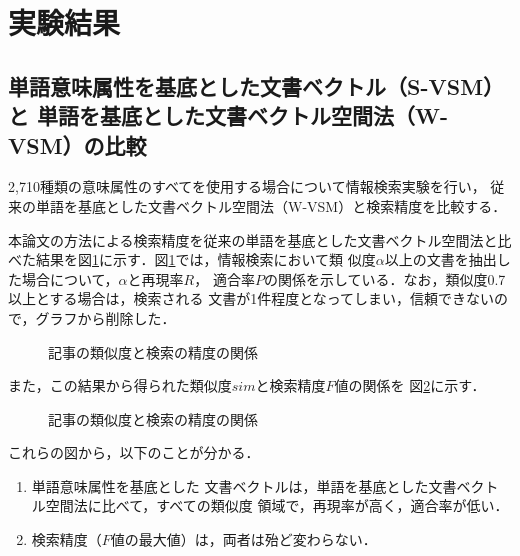 \section {実験結果}

\subsection{単語意味属性を基底とした文書ベクトル（S-VSM）と
単語を基底とした文書ベクトル空間法（W-VSM）の比較}

2,710種類の意味属性のすべてを使用する場合について情報検索実験を行い，
従来の単語を基底とした文書ベクトル空間法（W-VSM）と検索精度を比較する．

本論文の方法による検索精度を従来の単語を基底とした文書ベクトル空間法と比
べた結果を図\ref{result1}に示す．図\ref{result1}では，情報検索において類
似度$ \alpha $以上の文書を抽出した場合について，$ \alpha $と再現率$R$，
適合率$P$の関係を示している．なお，類似度0.7以上とする場合は，検索される
文書が1件程度となってしまい，信頼できないので，グラフから削除した．


\begin{figure}[ht]
 \begin{center}
 
 \end{center}
 \caption{記事の類似度と検索の精度の関係 }
 
 \label{result1}
\end{figure}


また，この結果から得られた類似度$ sim $と検索精度$F$値の関係を
図\ref{result2}に示す．


\begin{figure}[ht]
 \begin{center}
 \end{center}
 \caption{記事の類似度と検索の精度の関係}
 
 \label{result2}
\end{figure}

\newpage
これらの図から，以下のことが分かる．

\begin{enumerate}
  
\item 単語意味属性を基底とした
文書ベクトルは，単語を基底とした文書ベクトル空間法に比べて，すべての類似度
領域で，再現率が高く，適合率が低い．


\item 検索精度（$F$値の最大値）は，両者は殆ど変わらない．

\end{enumerate}

